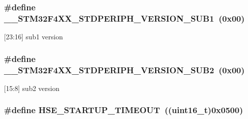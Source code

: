 \subsubsection[{\texorpdfstring{\+\_\+\+\_\+\+S\+T\+M32\+F4\+X\+X\+\_\+\+S\+T\+D\+P\+E\+R\+I\+P\+H\+\_\+\+V\+E\+R\+S\+I\+O\+N\+\_\+\+S\+U\+B1}{__STM32F4XX_STDPERIPH_VERSION_SUB1}}]{\setlength{\rightskip}{0pt plus 5cm}\#define \+\_\+\+\_\+\+S\+T\+M32\+F4\+X\+X\+\_\+\+S\+T\+D\+P\+E\+R\+I\+P\+H\+\_\+\+V\+E\+R\+S\+I\+O\+N\+\_\+\+S\+U\+B1~(0x00)}\hypertarget{group___library__configuration__section_gadce716e810a51b042298fb21b63e5366}{}\label{group___library__configuration__section_gadce716e810a51b042298fb21b63e5366}
\mbox{[}23\+:16\mbox{]} sub1 version 
\subsubsection[{\texorpdfstring{\+\_\+\+\_\+\+S\+T\+M32\+F4\+X\+X\+\_\+\+S\+T\+D\+P\+E\+R\+I\+P\+H\+\_\+\+V\+E\+R\+S\+I\+O\+N\+\_\+\+S\+U\+B2}{__STM32F4XX_STDPERIPH_VERSION_SUB2}}]{\setlength{\rightskip}{0pt plus 5cm}\#define \+\_\+\+\_\+\+S\+T\+M32\+F4\+X\+X\+\_\+\+S\+T\+D\+P\+E\+R\+I\+P\+H\+\_\+\+V\+E\+R\+S\+I\+O\+N\+\_\+\+S\+U\+B2~(0x00)}\hypertarget{group___library__configuration__section_ga4b16607e43a35289dc5ebb608b1261d4}{}\label{group___library__configuration__section_ga4b16607e43a35289dc5ebb608b1261d4}
\mbox{[}15\+:8\mbox{]} sub2 version 
\subsubsection[{\texorpdfstring{H\+S\+E\+\_\+\+S\+T\+A\+R\+T\+U\+P\+\_\+\+T\+I\+M\+E\+O\+UT}{HSE_STARTUP_TIMEOUT}}]{\setlength{\rightskip}{0pt plus 5cm}\#define H\+S\+E\+\_\+\+S\+T\+A\+R\+T\+U\+P\+\_\+\+T\+I\+M\+E\+O\+UT~((uint16\+\_\+t)0x0500)}\hypertarget{group___library__configuration__section_ga68ecbc9b0a1a40a1ec9d18d5e9747c4f}{}\label{group___library__configuration__section_ga68ecbc9b0a1a40a1ec9d18d5e9747c4f}


